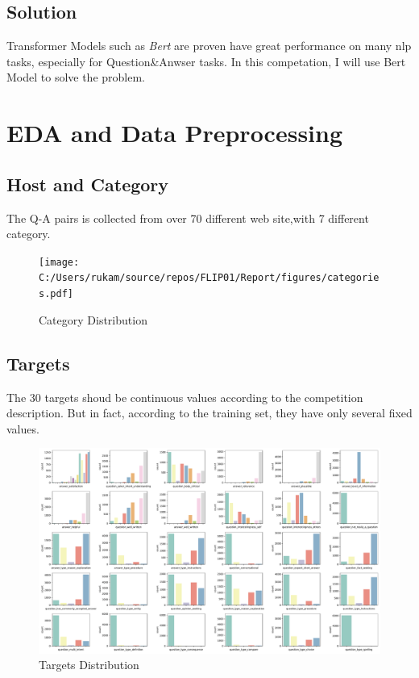 \subsection{Solution}
Transformer Models such as \textit{Bert} are proven have great performance on many nlp tasks, especially for Question\&Anwser tasks.
In this competation, I will use Bert Model to solve the problem.
\newpage
\section{EDA and Data Preprocessing} \label{sec-eda}
\subsection{Host and Category}
The Q-A pairs is collected from over 70 different web site,with 7 different category.
\begin{figure}[htbp]
    \centering
    \texttt{[image: C:/Users/rukam/source/repos/FLIP01/Report/figures/categories.pdf]}
    \caption{Category Distribution}
    \label{fig:categories}
\end{figure}
\subsection{Targets}
The 30 targets shoud be continuous values according to the competition description.
But in fact, according to the training set, they have only several fixed values.
\begin{figure}[htbp]
    \centering
    \centering
    \includegraphics[width=\linewidth]{figures/targets.pdf}
    \caption{Targets Distribution}
    \label{fig:targets}
\end{figure}

